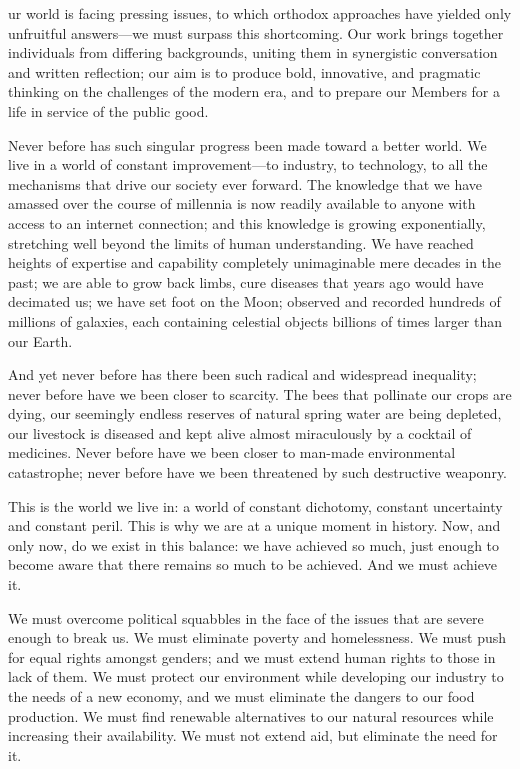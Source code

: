 
   ur world is facing pressing issues, to which orthodox approaches have
   yielded only unfruitful answers---we must surpass this shortcoming. Our
   work brings together individuals from differing backgrounds, uniting
   them in synergistic conversation and written reflection; our aim is to
   produce bold, innovative, and pragmatic thinking on the challenges of
   the modern era, and to prepare our Members for a life in service of the
   public good.

   Never before has such singular progress been made toward a better
   world. We live in a world of constant improvement---to industry, to
   technology, to all the mechanisms that drive our society ever forward.
   The knowledge that we have amassed over the course of millennia is now
   readily available to anyone with access to an internet connection; and
   this knowledge is growing exponentially, stretching well beyond the
   limits of human understanding. We have reached heights of expertise and
   capability completely unimaginable mere decades in the past; we are
   able to grow back limbs, cure diseases that years ago would have
   decimated us; we have set foot on the Moon; observed and recorded
   hundreds of millions of galaxies, each containing celestial objects
   billions of times larger than our Earth.

   And yet never before has there been such radical and widespread
   inequality; never before have we been closer to scarcity. The bees that
   pollinate our crops are dying, our seemingly endless reserves of
   natural spring water are being depleted, our livestock is diseased and
   kept alive almost miraculously by a cocktail of medicines. Never before
   have we been closer to man-made environmental catastrophe; never before
   have we been threatened by such destructive weaponry.

   This is the world we live in: a world of constant dichotomy, constant
   uncertainty and constant peril. This is why we are at a unique moment
   in history. Now, and only now, do we exist in this balance: we have
   achieved so much, just enough to become aware that there remains so
   much to be achieved. And we must achieve it.

   We must overcome political squabbles in the face of the issues that are
   severe enough to break us. We must eliminate poverty and homelessness.
   We must push for equal rights amongst genders; and we must extend human
   rights to those in lack of them. We must protect our environment while
   developing our industry to the needs of a new economy, and we must
   eliminate the dangers to our food production. We must find renewable
   alternatives to our natural resources while increasing their
   availability. We must not extend aid, but eliminate the need for it.


